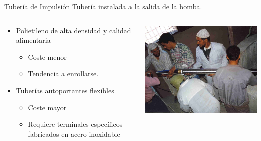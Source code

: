 \documentclass[xcolor={usenames,svgnames,dvipsnames}]{beamer}
\begin{document}
\begin{frame}[plain,label={sec:orgffeafc3}]{Tubería de Impulsión}
\alert{Tubería instalada a la salida de la bomba.}

\begin{columns}
\begin{column}{0.6\columnwidth}
\begin{itemize}
\item Polietileno de alta densidad y calidad alimentaria

\begin{itemize}
\item Coste menor

\item Tendencia a enrollarse.
\end{itemize}

\item Tuberías autoportantes flexibles

\begin{itemize}
\item Coste mayor

\item Requiere terminales específicos fabricados en acero inoxidable
\end{itemize}
\end{itemize}
\end{column}
\begin{column}{0.6\columnwidth}
\begin{center}
\includegraphics[width=.9\linewidth]{../figs/Marruecos4.png}
\end{center}
\end{column}
\end{columns}
\end{frame}
\end{document}
